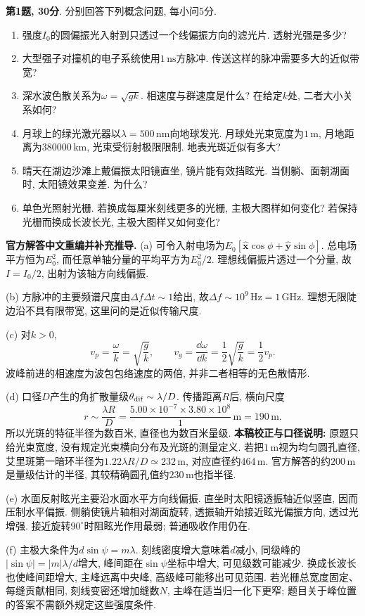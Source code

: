 \begin{exercise}
\textbf{第1题, 30分}. \label{exam:f3.1}
分别回答下列概念问题, 每小问5分.
\begin{enumerate}[label=(\alph*)]
\item 强度$I_0$的圆偏振光入射到只透过一个线偏振方向的滤光片. 透射光强是多少?
\item 大型强子对撞机的电子系统使用$1\,\mathrm{ns}$方脉冲. 传送这样的脉冲需要多大的近似带宽?
\item 深水波色散关系为$\omega=\sqrt{gk}$. 相速度与群速度是什么? 在给定$k$处, 二者大小关系如何?
\item 月球上的绿光激光器以$\lambda=500\,\mathrm{nm}$向地球发光. 月球处光束宽度为$1\,\mathrm m$, 月地距离为$380000\,\mathrm{km}$, 光束受衍射极限限制. 地表光斑近似有多大?
\item 晴天在湖边沙滩上戴偏振太阳镜直坐, 镜片能有效挡眩光. 当侧躺、面朝湖面时, 太阳镜效果变差. 为什么?
\item 单色光照射光栅. 若换成每厘米刻线更多的光栅, 主极大图样如何变化? 若保持光栅而换成长波长光, 主极大图样又如何变化?
\end{enumerate}
\end{exercise}
\begin{solution}
\textbf{官方解答中文重编并补充推导.}
(a) 可令入射电场为$E_0[\hat{\boldsymbol x}\cos\phi+\hat{\boldsymbol y}\sin\phi]$. 总电场平方恒为$E_0^2$, 而任意单轴分量的平均平方为$E_0^2/2$. 理想线偏振片透过一个分量, 故$I=I_0/2$, 出射为该轴方向线偏振.

(b) 方脉冲的主要频谱尺度由$\Delta f\Delta t\sim1$给出, 故$\Delta f\sim10^9\,\mathrm{Hz}=1\,\mathrm{GHz}$. 理想无限陡边沿不具有限带宽, 这里问的是近似传输尺度.

(c) 对$k>0$,
\[
v_p=\frac\omega k=\sqrt{\frac gk},\qquad
v_g=\frac{\dd\omega}{\dd k}=\frac12\sqrt{\frac gk}=\frac12v_p.
\]
波峰前进的相速度为波包包络速度的两倍, 并非二者相等的无色散情形.

(d) 口径$D$产生的角扩散量级$\theta_{\rm dif}\sim\lambda/D$. 传播距离$R$后, 横向尺度
\[
r\sim\frac{\lambda R}{D}
=\frac{5.00\times10^{-7}\times3.80\times10^8}{1}\,\mathrm m
=190\,\mathrm m.
\]
所以光斑的特征半径为数百米, 直径也为数百米量级. \textbf{本稿校正与口径说明:} 原题只给光束宽度, 没有规定光束横向分布及光斑的测量定义. 若把$1\,\mathrm m$视为均匀圆孔直径, 艾里斑第一暗环半径为$1.22\lambda R/D\simeq232\,\mathrm m$, 对应直径约$464\,\mathrm m$. 官方解答的约$200\,\mathrm m$是量级估计的半径, 其较精确圆孔值约$230\,\mathrm m$也指半径.

(e) 水面反射眩光主要沿水面水平方向线偏振. 直坐时太阳镜透振轴近似竖直, 因而压制水平偏振. 侧躺使镜片轴相对湖面旋转, 透振轴开始接近眩光偏振方向, 透过光增强. 接近旋转$90^\circ$时阻眩光作用最弱; 普通吸收作用仍在.

(f) 主极大条件为$d\sin\psi=m\lambda$. 刻线密度增大意味着$d$减小, 同级峰的$|\sin\psi|=|m|\lambda/d$增大, 峰间距在$\sin\psi$坐标中增大, 可见级数可能减少. 换成长波长也使峰间距增大, 主峰远离中央峰, 高级峰可能移出可见范围. 若光栅总宽度固定、每缝贡献相同, 刻线变密还增加缝数$N$, 主峰在适当归一化下更窄; 题目关于峰位置的答案不需额外规定这些强度条件.
\end{solution}

